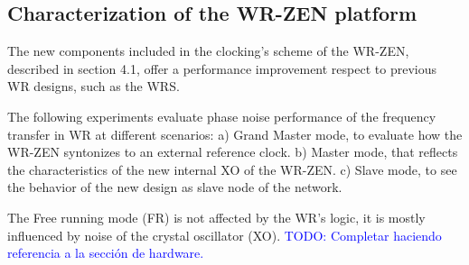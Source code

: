 \subsection{Characterization of the WR-ZEN platform}
\label{subsec: charact_zen}


The new components included in the clocking's scheme of the WR-ZEN, described in section  4.1, offer a performance improvement respect to previous WR designs, such as the WRS. 


The following experiments evaluate phase noise performance of the frequency transfer in WR at different scenarios: a) Grand Master mode, to evaluate how the WR-ZEN syntonizes to an external reference clock. b) Master mode, that reflects the characteristics of the new internal XO of the WR-ZEN. c) Slave mode, to see the behavior of the new design as slave node of the network.

The Free running mode (FR) is not affected by the WR's logic, it is mostly influenced by noise of the crystal oscillator (XO). \textcolor{blue}{TODO: Completar haciendo referencia a la sección de hardware.}

